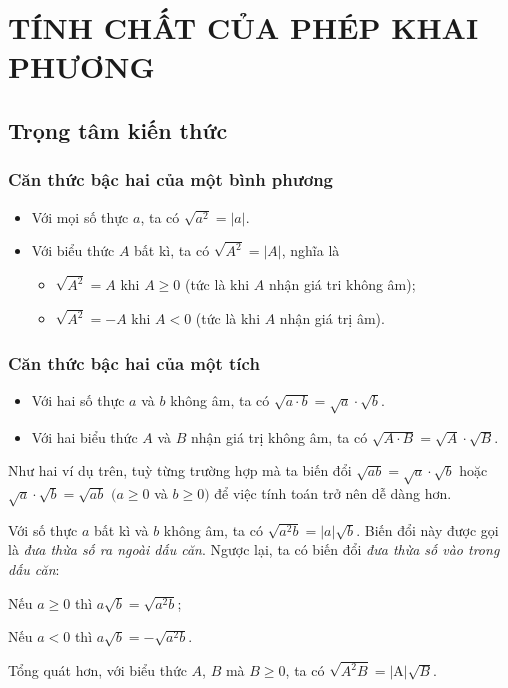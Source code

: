 \setcounter{section}{2}
\section{TÍNH CHẤT CỦA PHÉP KHAI PHƯƠNG}
\subsection{Trọng tâm kiến thức}
\begin{tomtat}
\subsubsection{Căn thức bậc hai của một bình phương}
\begin{boxdn}
	\begin{itemize}
	\item
	Với mọi số thực $a$, ta có $\sqrt{a^{2}}=|a|$.
	\item
	Với biểu thức $A$ bất kì, ta có $\sqrt{A^{2}}=|A|$, nghĩa là 
	\begin{itemize}
	\item $\sqrt{A^{2}}=A$ khi $A \geq 0$ (tức là khi $A$ nhận giá tri không âm); 
	\item $\sqrt{A^{2}}=-A$ khi $A<0$ (tức là khi $A$ nhận giá trị âm).
	\end{itemize}
	\end{itemize}
\end{boxdn}
\subsubsection{Căn thức bậc hai của một tích}
\begin{boxdn}
	\begin{itemize}
	\item 
	Với hai số thực $a$ và $b$ không âm, ta có
	$
	\sqrt{a\cdot b}=\sqrt{a} \cdot \sqrt{b}.
	$
	\item
	Với hai biểu thức $A$ và $B$ nhận giá trị không âm, ta có
	$
	\sqrt{A \cdot B}=\sqrt{A} \cdot \sqrt{B}.
	$
	\end{itemize}
\end{boxdn}
\begin{nx}%
	Như hai ví dụ trên, tuỳ từng trường hợp mà ta biến đổi $\sqrt{ab}=\sqrt{a} \cdot \sqrt{b}$ hoặc $\sqrt{a} \cdot \sqrt{b}=\sqrt{ab}$ $(a \geq 0$ và $b \geq 0)$ để việc tính toán trở nên dễ dàng hơn.
\end{nx}
\begin{boxdn}
	Với số thực $a$ bất kì và $b$ không âm, ta có
	$
	\sqrt{a^{2} b}=|a| \sqrt{b}.
	$
	Biến đổi này được gọi là {\it đưa thừa số ra ngoài dấu căn}.
	Ngược lại, ta có biến đổi {\it đưa thừa số vào trong dấu căn}:	
	\begin{enumEX}[\itemCI]{2}
	\item Nếu $a \geq 0$ thì $a \sqrt{b}=\sqrt{a^{2} b}$;
	\item Nếu $a<0$ thì $a \sqrt{b}=-\sqrt{a^{2} b}$.
	\end{enumEX}	
\end{boxdn} %
\begin{nx}
	Tổng quát hơn, với biểu thức $A$, $B$ mà $B \geq 0$, ta có $\sqrt{A^{2} B}=|\mathrm{A}| \sqrt{B}$.
\end{nx}

\end{tomtat}
